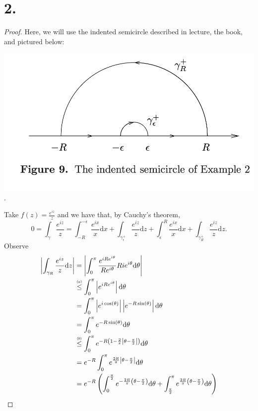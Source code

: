 \documentclass{article}
\newcommand\numleq[1]
  {\stackrel{\scriptscriptstyle(\mkern-1.5mu#1\mkern-1.5mu)}{\leq}}
\begin{document}
\section*{2.}
\begin{proof}
  Here, we will use the indented semicircle described in lecture, the book, and pictured below:\\
  \begin{center}
  \includegraphics[scale = 0.5]{Indented_Semicircle.png}.
  \end{center}
  Take $f(z) = \frac{e^{iz}}{z}$ and we have that, by Cauchy's theorem, 
  \[
  0 = \int_{\gamma}\frac{e^{iz}}{z} = \int_{-R}^{-\epsilon} \frac{e^{ix}}{x}\mathrm{d}x + \int_{\gamma_{\epsilon}^+}\frac{e^{iz}}{z} \mathrm{d}z + \int_{\epsilon}^{R}\frac{e^{ix}}{x}\mathrm{d}x + \int_{\gamma_R^+}\frac{e^{iz}}{z}\mathrm{d}z.  
  \]
  Observe
  \begin{align*}
    \left|\int_{\gamma_R} \frac{e^{iz}}{z} \mathrm{d}z \right| &= \left|\int_0^{\pi}\frac{e^{iRe^{i \theta}}}{Re^{i \theta}}Rie^{i \theta} \mathrm{d} \theta \right|\\
    &\numleq{a} \int_0^{\pi}\left|e^{iRe^{i \theta}} \right| \mathrm{d} \theta \\ 
    &= \int_0^{\pi} \left|e^{i \cos(\theta)}\right|\left|e^{-R \sin(\theta)} \right|\mathrm{d}\theta \\
    &= \int_0^{\pi}e^{-R \sin(\theta)} \mathrm{d}\theta \\
    &\numleq{b} \int_0^{\pi}e^{-R\left(1 - \frac{2}{\pi} \left|\theta - \frac{\pi}{2}\right|\right)}\mathrm{d}\theta \\
    &= e^{-R}\int_0^{\pi}e^{\frac{2R}{\pi}\left|\theta - \frac{\pi}{2}\right|} \mathrm{d}\theta \\
    &= e^{-R}\left(\int_0^{\frac{\pi}{2}}e^{-\frac{2R}{\pi}\left(\theta - \frac{\pi}{2}\right)} \mathrm{d}\theta + \int_{\frac{\pi}{2}}^{\pi}e^{\frac{2R}{\pi}\left(\theta - \frac{\pi}{2}\right)} \mathrm{d}\theta \right) \\

\end{align*}
\end{proof}
\end{document}
